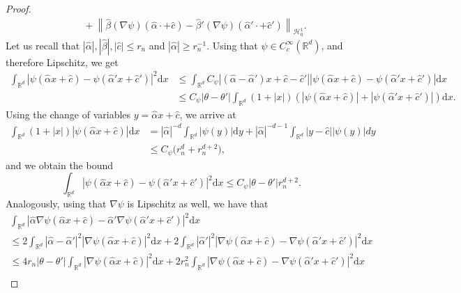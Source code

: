 \documentclass[10pt,a4paper]{amsart}
\newcommand{\R}{\mathbb{R}}
\newcommand{\abs}[1]{\left|#1\right|} %
\newcommand{\cH}{\mathcal{H}}
\newcommand{\norm}[1]{\left\|#1 \right\|} %
\def\ud{\mathrm d}
\begin{document}
\begin{proof}
\begin{align}
    &\qquad + \norm{\hat\beta \left( \nabla \psi \right) \left( \hat\alpha \cdot + \hat c \right)-\hat\beta' \left( \nabla \psi \right) \left( \hat\alpha' \cdot + \hat c' \right)}_{\cH_0^1}.
\end{align}
Let us recall that $\abs{\hat \alpha}, |\hat\beta|,\abs{\hat c}\le r_n$ and $\abs{\hat \alpha}\ge r_n^{-1}$. 
Using that $\psi \in C_c^{\infty} \left( \mathbb{R}^d \right)$, and therefore Lipschitz, we get
\begin{align*}
\int_{\R^d} \abs{\psi \left( \hat\alpha x + \hat c \right)-\psi \left( \hat\alpha' x + \hat c'\right)}^2\ud x 
    & \le \int_{\R^d} C_\psi \abs{\left(\hat\alpha - \hat \alpha' \right) x + \hat c - \hat c'} \abs{\psi \left( \hat\alpha x + \hat c \right) - \psi \left( \hat\alpha' x + \hat c'\right)} \ud x \\
    & \le C_\psi \abs{\theta-\theta'} \int_{\R^d} \left( 1 + \abs{x} \right) \left( \abs{\psi \left( \hat\alpha x + \hat c \right)}+ \abs{\psi \left( \hat\alpha' x + \hat c'\right)} \right) \ud x.
\end{align*}
Using the change of variables $y = \hat \alpha x + \hat c$, we arrive at
\begin{align*}
    \int_{\R^d} \left( 1 + \abs{x} \right) \abs{\psi \left( \hat\alpha x + \hat c \right)} \ud x & = \abs{\hat \alpha}^{-d} \int_{\R^d} \abs{\psi (y)} \ud y + \abs{\hat \alpha}^{-d-1} \int_{\R^d} \abs{y - \hat c} \abs{\psi \left( y \right)} dy \\
    & \le C_\psi \Big( r_n^{d} + r_n^{d+2} \Big),
\end{align*}
and we obtain the bound
\[
    \int_{\R^d} \abs{\psi \left( \hat\alpha x + \hat c \right)-\psi \left( \hat\alpha' x + \hat c'\right)}^2\ud x \leq C_\psi \abs{\theta-\theta'} r_n^{d+2}.
\]
Analogously, using that $\nabla \psi$ is Lipschitz as well, we have that
\begin{multline*}
\int_{\R^d} \abs{\hat \alpha\nabla\psi\left( \hat\alpha x + \hat c \right)-\hat \alpha'\nabla\psi \left( \hat\alpha' x + \hat c'\right)}^2\ud x \\
     \le 2\int_{\R^d} \abs{\hat\alpha-\hat \alpha'}^2\abs{\nabla\psi \left( \hat\alpha x + \hat c \right)}^2\ud x + 2\int_{\R^d}\abs{\hat \alpha'}^2\abs{\nabla\psi \left( \hat\alpha x + \hat c \right)-\nabla\psi \left( \hat\alpha' x + \hat c'\right)}^2\ud x \\
      \le 4 r_n \abs{\theta - \theta'} \int_{\R^d} \abs{\nabla\psi \left( \hat\alpha x + \hat c \right)}^2\ud x + 2 r_n^2 \int_{\R^d} \abs{\nabla\psi \left( \hat\alpha x + \hat c \right)-\nabla\psi \left( \hat\alpha' x + \hat c'\right)}^2\ud x \\

\end{multline*}
\end{proof}
\end{document}
